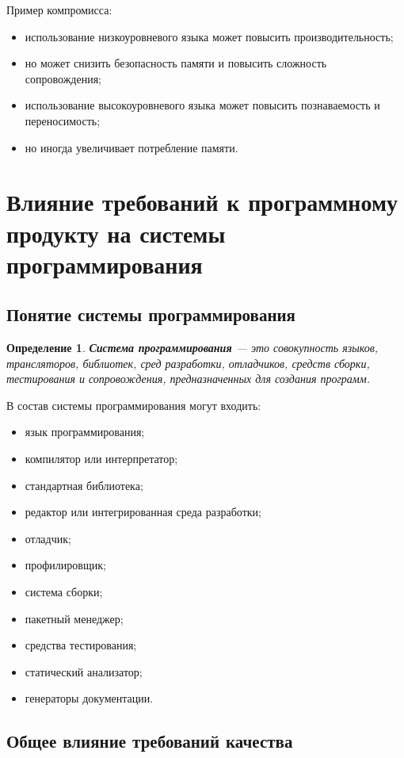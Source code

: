 \documentclass[12pt,a4paper]{article}
\newtheorem{definition}{Определение}
\begin{document}
Пример компромисса:
\begin{itemize}
    \item использование низкоуровневого языка может повысить производительность;
    \item но может снизить безопасность памяти и повысить сложность сопровождения;
    \item использование высокоуровневого языка может повысить познаваемость и переносимость;
    \item но иногда увеличивает потребление памяти.
\end{itemize}

\section{Влияние требований к программному продукту на системы программирования}

\subsection{Понятие системы программирования}

\begin{definition}
\textbf{Система программирования} --- это совокупность языков, трансляторов, библиотек, сред разработки, отладчиков, средств сборки, тестирования и сопровождения, предназначенных для создания программ.
\end{definition}

В состав системы программирования могут входить:
\begin{itemize}
    \item язык программирования;
    \item компилятор или интерпретатор;
    \item стандартная библиотека;
    \item редактор или интегрированная среда разработки;
    \item отладчик;
    \item профилировщик;
    \item система сборки;
    \item пакетный менеджер;
    \item средства тестирования;
    \item статический анализатор;
    \item генераторы документации.
\end{itemize}

\subsection{Общее влияние требований качества}
\end{document}
